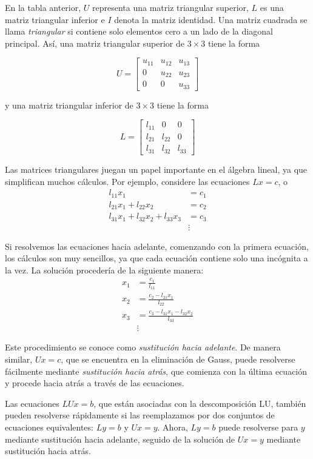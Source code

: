 \documentclass[12pt,letterpaper]{article}
\theoremstyle{definition}
\theoremstyle{plain}
\theoremstyle{remark}
\begin{document}
En la tabla anterior, $U$ representa una matriz triangular superior, $L$ es una matriz triangular inferior e $I$ denota la matriz identidad. Una matriz cuadrada se llama \textit{triangular} si contiene solo elementos cero a un lado de la diagonal principal. Así, una matriz triangular superior de $3 \times 3$ tiene la forma

\[
U = \begin{bmatrix}
u_{11} & u_{12} & u_{13} \\
0 & u_{22} & u_{23} \\
0 & 0 & u_{33}
\end{bmatrix}
\]

y una matriz triangular inferior de $3 \times 3$ tiene la forma

\[
L = \begin{bmatrix}
l_{11} & 0 & 0 \\
l_{21} & l_{22} & 0 \\
l_{31} & l_{32} & l_{33}
\end{bmatrix}
\]

Las matrices triangulares juegan un papel importante en el álgebra lineal, ya que simplifican muchos cálculos. Por ejemplo, considere las ecuaciones $Lx = c$, o
\begin{align*}
l_{11}x_1 &= c_1 \\
l_{21}x_1 + l_{22}x_2 &= c_2 \\
l_{31}x_1 + l_{32}x_2 + l_{33}x_3 &= c_3 \\
&\vdots
\end{align*}

Si resolvemos las ecuaciones hacia adelante, comenzando con la primera ecuación, los cálculos son muy sencillos, ya que cada ecuación contiene solo una incógnita a la vez. La solución procedería de la siguiente manera:
\begin{align*}
x_1 &= \frac{c_1}{l_{11}} \\
x_2 &= \frac{c_2 - l_{21}x_1}{l_{22}} \\
x_3 &= \frac{c_3 - l_{31}x_1 - l_{32}x_2}{l_{33}} \\
&\vdots
\end{align*}

Este procedimiento se conoce como \textit{sustitución hacia adelante}. De manera similar, $Ux = c$, que se encuentra en la eliminación de Gauss, puede resolverse fácilmente mediante \textit{sustitución hacia atrás}, que comienza con la última ecuación y procede hacia atrás a través de las ecuaciones.

Las ecuaciones $LUx = b$, que están asociadas con la descomposición LU, también pueden resolverse rápidamente si las reemplazamos por dos conjuntos de ecuaciones equivalentes: $Ly = b$ y $Ux = y$. Ahora, $Ly = b$ puede resolverse para $y$ mediante sustitución hacia adelante, seguido de la solución de $Ux = y$ mediante sustitución hacia atrás.
\end{document}
